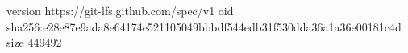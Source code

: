 version https://git-lfs.github.com/spec/v1
oid sha256:e28e87e9ada8e64174e521105049bbbdf544edb31f530dda36a1a36e00181c4d
size 449492
